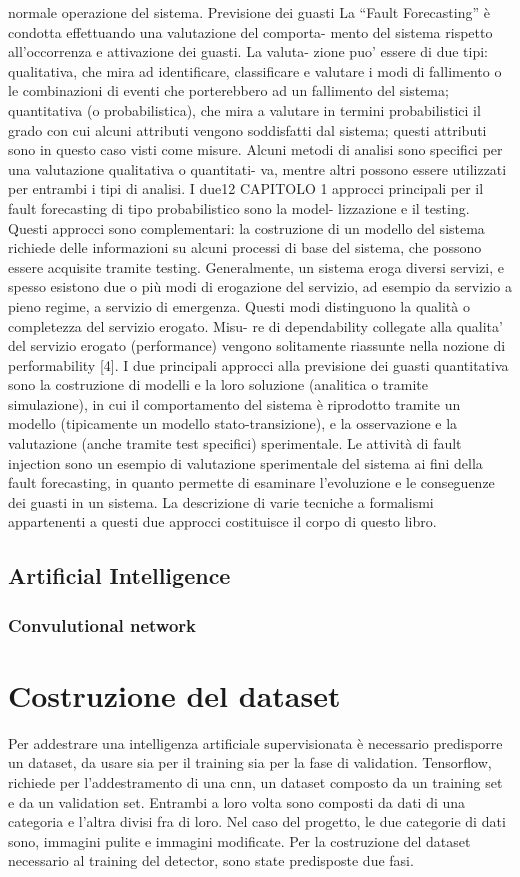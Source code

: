 \documentclass[14pt]{extarticle}
\begin{document}
normale operazione del sistema.
Previsione dei guasti
La “Fault Forecasting” è condotta effettuando una valutazione del comporta-
mento del sistema rispetto all’occorrenza e attivazione dei guasti. La valuta-
zione puo’ essere di due tipi: qualitativa, che mira ad identificare, classificare
e valutare i modi di fallimento o le combinazioni di eventi che porterebbero ad
un fallimento del sistema; quantitativa (o probabilistica), che mira a valutare
in termini probabilistici il grado con cui alcuni attributi vengono soddisfatti
dal sistema; questi attributi sono in questo caso visti come misure. Alcuni
metodi di analisi sono specifici per una valutazione qualitativa o quantitati-
va, mentre altri possono essere utilizzati per entrambi i tipi di analisi. I due12
CAPITOLO 1
approcci principali per il fault forecasting di tipo probabilistico sono la model-
lizzazione e il testing. Questi approcci sono complementari: la costruzione di
un modello del sistema richiede delle informazioni su alcuni processi di base
del sistema, che possono essere acquisite tramite testing. Generalmente, un
sistema eroga diversi servizi, e spesso esistono due o più modi di erogazione
del servizio, ad esempio da servizio a pieno regime, a servizio di emergenza.
Questi modi distinguono la qualità o completezza del servizio erogato. Misu-
re di dependability collegate alla qualita’ del servizio erogato (performance)
vengono solitamente riassunte nella nozione di performability [4].
I due principali approcci alla previsione dei guasti quantitativa sono la
costruzione di modelli e la loro soluzione (analitica o tramite simulazione), in
cui il comportamento del sistema è riprodotto tramite un modello (tipicamente
un modello stato-transizione), e la osservazione e la valutazione (anche tramite
test specifici) sperimentale. Le attività di fault injection sono un esempio di
valutazione sperimentale del sistema ai fini della fault forecasting, in quanto
permette di esaminare l’evoluzione e le conseguenze dei guasti in un sistema.
La descrizione di varie tecniche a formalismi appartenenti a questi due approcci
costituisce il corpo di questo libro.

\subsection{Artificial Intelligence}
\subsubsection{Convulutional network}
\section{Costruzione del dataset}
Per addestrare una intelligenza artificiale supervisionata è necessario predisporre un dataset, da usare sia per il training sia per la fase di validation.
Tensorflow, richiede per l'addestramento di una cnn, un dataset composto da un training set e da un validation set. Entrambi a loro volta sono composti da dati di una categoria e l'altra divisi fra di loro. Nel caso del progetto, le due categorie di dati sono, immagini pulite e immagini modificate.
Per la costruzione del dataset necessario al training del detector, sono state predisposte due fasi.
\end{document}
